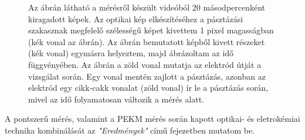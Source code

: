\begin{figure}[h!]
\caption{Az ábrán látható a mérésről készült videóból 20 másodpercenként kiragadott képek. Az optikai kép elkészítéséhez a pásztázási szakasznak megfelelő szélességű képet kivettem 1 pixel magasságban (kék vonal az ábrán). Az ábrán bemutatott képből kivett részeket (kék vonal) egymásra helyeztem, majd ábrázoltam az idő függvényében. Az ábrán a zöld vonal mutatja az elektród útját a vizsgálat során. Egy vonal mentén zajlott a pásztázás, azonban az elektród egy cikk-cakk vonalat (zöld vonal) ír le a pásztázás során, mivel az idő folyamatosan változik a mérés alatt.}
\label{fig:pasztazas}
\end{figure}

A pontszerű mérés, valamint a PEKM mérés során kapott optikai- és eletrokémiai technika kombinálását az \emph{"Eredmények"} című fejezetben mutatom be.
